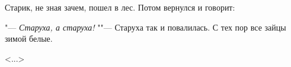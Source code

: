 Старик, не зная зачем, пошел в лес. Потом вернулся и говорит:

"--- \textit{Старуха, а старуха!} ""--- Старуха так и повалилась. С тех пор все зайцы зимой белые.

\hfill <...>
